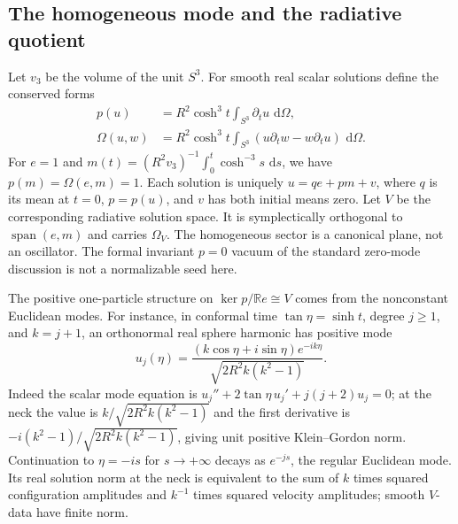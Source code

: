 \documentclass[11pt]{article}
\newcommand{\dd}{\,\mathrm d}
\numberwithin{equation}{section}
\begin{document}
\subsection{The homogeneous mode and the radiative quotient}

Let \(v_3\) be the volume of the unit \(S^3\). For smooth real scalar
solutions define the conserved forms
\begin{align}
 p(u)&=R^2\cosh^3t\int_{S^3}\partial_tu\,\dd\Omega,\\
 \Omega(u,w)&=R^2\cosh^3t
       \int_{S^3}(u\partial_tw-w\partial_tu)\,\dd\Omega .
 \label{eq:symp}
\end{align}
For \(e=1\) and \(m(t)=(R^2v_3)^{-1}\int_0^t\cosh^{-3}s\,\dd s\),
we have \(p(m)=\Omega(e,m)=1\). Each solution is uniquely
\(u=q e+p m+v\), where \(q\) is its mean at \(t=0\), \(p=p(u)\),
and \(v\) has both initial means zero. Let \(V\) be the corresponding
radiative solution space. It is symplectically orthogonal to
\(\operatorname{span}(e,m)\) and carries \(\Omega_V\).
The homogeneous sector is a canonical plane, not an oscillator.
The formal invariant \(p=0\) vacuum of the standard zero-mode
discussion \cite[Sec.~IV]{kg} is not a normalizable seed here.

The positive one-particle structure on \(\ker p/\mathbb R e\cong V\)
comes from the nonconstant Euclidean modes. For instance, in
conformal time \(\tan\eta=\sinh t\), degree \(j\ge1\), and \(k=j+1\),
an orthonormal real sphere harmonic has positive mode
\[
 u_j(\eta)=
 \frac{(k\cos\eta+i\sin\eta)e^{-ik\eta}}
 {\sqrt{2R^2 k(k^2-1)}} .
\]
Indeed the scalar mode equation is
\(u_j''+2\tan\eta\,u_j'+j(j+2)u_j=0\); at the neck the value is
\(k/\sqrt{2R^2k(k^2-1)}\) and the first derivative is
\(-i(k^2-1)/\sqrt{2R^2k(k^2-1)}\), giving unit positive
Klein--Gordon norm. Continuation to \(\eta=-is\) for
\(s\to+\infty\) decays as \(e^{-js}\), the regular Euclidean mode.
Its real solution norm at the neck is equivalent to the sum of
\(k\) times squared configuration amplitudes and \(k^{-1}\) times
squared velocity amplitudes; smooth \(V\)-data have finite norm.
\end{document}
